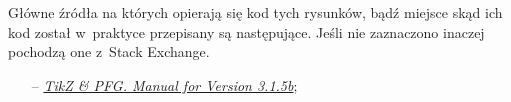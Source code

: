 \documentclass[a4paper,11pt]{article}
\begin{document}














Główne źródła na których opierają się kod tych rysunków, bądź miejsce
skąd ich kod został w~praktyce przepisany są następujące. Jeśli nie
zaznaczono inaczej pochodzą one z~Stack Exchange.

\begin{itemize}
\item[--]
  \href{http://mirrors.nic.cz/tex-archive/graphics/pgf/base/doc/pgfmanual.pdf}
  {\emph{Ti\emph{k}Z \& PFG. Manual for Version 3.1.5b}};





\end{itemize}











\end{document}
